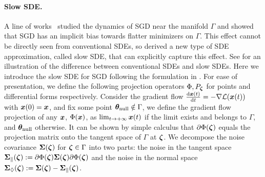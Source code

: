 \paragraph{Slow SDE.} A line of works~\citep{blanc2020implicit,damian2021label,li2021happens} studied the dynamics of SGD near the manifold $\Gamma$ and showed that 
SGD has an implicit bias towards flatter minimizers on $\Gamma$.
This effect cannot be directly seen from conventional SDEs, so \citet{li2021happens} derived a new type of SDE approximation, called slow SDE, that can explicitly capture this effect.
See  for an illustration of the difference between conventional SDEs and slow SDEs.
Here we introduce the slow SDE for SGD following the formulation in \citet{gu2024a}.
For ease of presentation, we define the following projection operators $\Phi, P_{{\bm{\zeta}}}$
for points and differential forms respectively. Consider the gradient flow $\frac{\mathrm{d} {\bm{x}}(t)}{\mathrm{d} t} = -\nabla
\mathcal{L}({\bm{x}}(t))$ with ${\bm{x}}(0)={\bm{x}}$, and fix some point ${\bm{\theta}}_{\mathrm{null}} \notin \Gamma$, we define the gradient flow projection of any ${\bm{x}}$, $\Phi({\bm{x}})$, as $\lim_{t\to +\infty} {\bm{x}}(t)$ if the limit exists and belongs to $\Gamma$, and ${\bm{\theta}}_{\mathrm{null}}$ otherwise. It can be shown by simple calculus \citep{li2021happens} that $\partial \Phi({\bm{\zeta}})$ equals the
projection matrix onto the tangent space of $\Gamma$ at ${\bm{\zeta}}$.
We decompose the noise covariance ${\bm{\Sigma}}({\bm{\zeta}})$ for ${\bm{\zeta}}
\in \Gamma$ into two parts: the noise in the tangent space
${\bm{\Sigma}}_{\parallel}({\bm{\zeta}}) := \partial \Phi({\bm{\zeta}}) {\bm{\Sigma}}({\bm{\zeta}}) \partial
\Phi({\bm{\zeta}})$ and the noise in the normal space ${\bm{\Sigma}}_{\Diamond}({\bm{\zeta}}) :=
{\bm{\Sigma}}({\bm{\zeta}}) - {\bm{\Sigma}}_{\parallel}({\bm{\zeta}})$.

